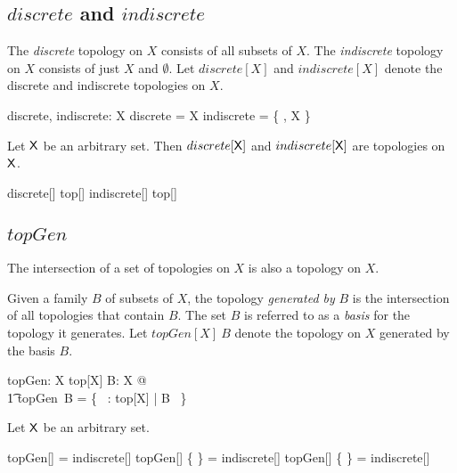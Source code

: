 \documentclass[11pt, oneside]{article}
\begin{document}
\subsection{$discrete$ and $indiscrete$}

The {\it discrete} topology on $X$ consists of all subsets of $X$.
The {\it indiscrete} topology on $X$ consists of just $X$ and $\emptyset$.
Let $discrete[X]$ and $indiscrete[X]$ denote the discrete and indiscrete topologies on $X$.

\begin{gendef}[X]
	discrete, indiscrete: \family X
\where
	discrete = \power X
\also
	indiscrete =  \{ \emptyset, X \}
\end{gendef}

\begin{example}
Let $\mathsf{X}$ be an arbitrary set.
Then $discrete[\mathsf{X}]$ and $indiscrete[\mathsf{X}]$ are topologies on $\mathsf{X}$.

\begin{zed}
	discrete[\setX] \in top[\setX] 
\also
	indiscrete[\setX] \in top[\setX]
\end{zed}

\end{example}

\subsection{$topGen$}

\begin{remark}

The intersection of a set of topologies on $X$ is also a topology on $X$.

\end{remark}

Given a family $B$ of subsets of $X$, the topology {\it generated by} $B$ is the intersection of all
topologies that contain $B$.
The set $B$ is referred to as a {\it basis} for the topology it generates.
Let $topGen[X]~B$ denote the topology on $X$ generated by the basis $B$.

\begin{gendef}[X]
	topGen: \family X \fun top[X]
\where
	\forall B: \family X @ \\
	\t1	topGen~B = \bigcap \{~ \tau: top[X] | B \subseteq \tau ~\}
\end{gendef}

\begin{example}
Let $\mathsf{X}$ be an arbitrary set.

\begin{zed}
	topGen[\setX] \emptyset = indiscrete[\setX]
\also
	topGen[\setX] \{ \emptyset \} = indiscrete[\setX]
\also
	topGen[\setX] \{ \setX \} = indiscrete[\setX]
\end{zed}

\end{example}
\end{document}
